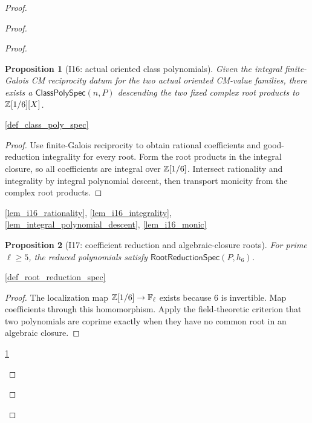 \documentclass[11pt,a4paper]{article}
\numberwithin{equation}{section}
\theoremstyle{plain}\newtheorem{theorem}{Theorem}[section]\newaliascnt{proposition}{theorem}\newtheorem{proposition}[proposition]{Proposition}\aliascntresetthe{proposition}\newaliascnt{lemma}{theorem}\newtheorem{lemma}[lemma]{Lemma}\aliascntresetthe{lemma}
\theoremstyle{definition}\newaliascnt{definition}{theorem}\newtheorem{definition}[definition]{Definition}\aliascntresetthe{definition}\newaliascnt{notation}{theorem}\newtheorem{notation}[notation]{Notation}\aliascntresetthe{notation}
\providecommand{\lean}[1]{}\providecommand{\leanok}{}
\begin{document}
\begin{proof}
\begin{proof}
\begin{proof}
\begin{proposition}[I16: actual oriented class polynomials]\label{prop_i16_class_polynomials}\lean{SptCM.CM.Repaired.ActualOrientedCMCoordinates.exists_actualClassPolynomialSpec_of_E8}\leanok
Given the integral finite-Galois CM reciprocity datum for the two actual
oriented CM-value families, there exists a
$\mathsf{ClassPolySpec}(n,P)$ descending the two fixed complex root products
to $\mathbb Z[1/6][X]$.
\end{proposition}
\begin{uses-statement}\ref{def_class_poly_spec}\end{uses-statement}
\begin{proof}
Use finite-Galois reciprocity to obtain rational coefficients and
good-reduction integrality for every root.  Form the root products in the
integral closure, so all coefficients are integral over $\mathbb Z[1/6]$.
Intersect rationality and integrality by integral polynomial descent, then
transport monicity from the complex root products.
\end{proof}
\begin{uses-proof}\ref{lem_i16_rationality}, \ref{lem_i16_integrality}, \ref{lem_integral_polynomial_descent}, \ref{lem_i16_monic}\end{uses-proof}

\begin{proposition}[I17: coefficient reduction and algebraic-closure roots]\label{prop_i17_root_reduction}\lean{SptCM.CM.Repaired.ActualClassPolynomialSpec.actualRootReductionSpec}\leanok
For prime $\ell\ge5$, the reduced polynomials satisfy
$\mathsf{RootReductionSpec}(P,h_6)$.
\end{proposition}
\begin{uses-statement}\ref{def_root_reduction_spec}\end{uses-statement}
\begin{proof}
The localization map $\mathbb Z[1/6]\to\mathbb F_\ell$ exists because $6$ is invertible.  Map coefficients through this homomorphism.  Apply the field-theoretic criterion that two polynomials are coprime exactly when they have no common root in an algebraic closure.
\end{proof}
\begin{uses-proof}\ref{prop_i16_class_polynomials}\end{uses-proof}


\end{proof}
\end{proof}
\end{proof}
\end{document}
